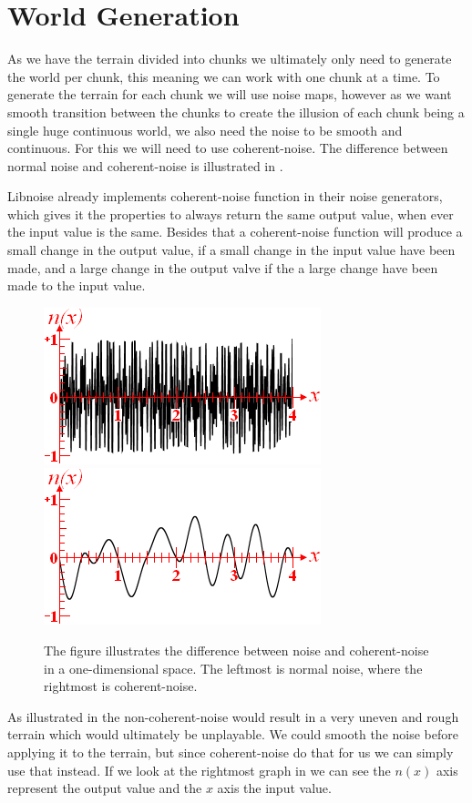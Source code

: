 \section{World Generation}
\label{WorldGeneration}
As we have the terrain divided into chunks we ultimately only need to generate the world per chunk, this meaning we can work with one chunk at a time. To generate the terrain for each chunk we will use noise maps, however as we want smooth transition between the chunks to create the illusion of each chunk being a single huge continuous world, we also need the noise to be smooth and continuous. For this we will need to use coherent-noise. The difference between normal noise and coherent-noise is illustrated in .

Libnoise already implements coherent-noise function in their noise generators, which gives it the properties to always return the same output value, when ever the input value is the same. Besides that a coherent-noise function will produce a small change in the output value, if a small change in the input value have been made, and a large change in the output valve if the a large change have been made to the input value\cite{coherentnoise}.

\begin{figure}[H]
		\includegraphics[width=0.49\linewidth]{img/noise}\includegraphics[width=0.49\linewidth]{img/coherentnoise}
		\centering
		\caption{The figure illustrates the difference between noise and coherent-noise in a one-dimensional space. The leftmost is normal noise, where the rightmost is coherent-noise.}
		\label{fig:noise}
\end{figure}

As illustrated in  the non-coherent-noise would result in a very uneven and rough terrain which would ultimately be unplayable. We could smooth the noise before applying it to the terrain, but since coherent-noise do that for us we can simply use that instead. If we look at the rightmost graph in  we can see the $n(x)$ axis represent the output value and the $x$ axis the input value.

